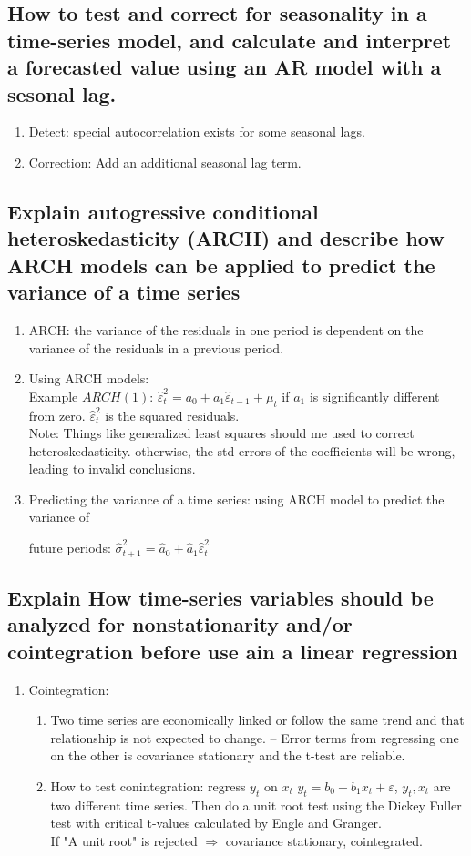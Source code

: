 \documentclass{article}
\newcommand{\be}{\begin{enumerate}}
\newcommand{\ee}{\end{enumerate}}
\begin{document}
\subsection{How to test and correct for seasonality in a time-series model, and 
calculate and interpret a forecasted value using an AR model with a sesonal lag.}
\be
    \item Detect: special autocorrelation exists for some seasonal lags.
    \item Correction: Add an additional seasonal lag term.
\ee
\subsection{Explain autogressive conditional heteroskedasticity (ARCH) and describe
how ARCH models can be applied to predict the variance of a time series}
\be
    \item ARCH: the variance of the residuals in one period is dependent on the variance of
        the residuals in a previous period.
    \item Using ARCH models:
        \\Example $ARCH(1)$: $\hat{\varepsilon}_t^2=a_0+a_1\hat{\varepsilon}_{t-1}+\mu_t$
        if $a_1$ is significantly different from zero. $\hat{\varepsilon}_t^2$ is the squared residuals.
        \\Note: Things like generalized least squares should me used to 
                correct heteroskedasticity. otherwise, the std errors of the 
                coefficients will be wrong, leading to invalid conclusions.
    \item Predicting the variance of a time series: using ARCH model to predict the variance of 

        future periods: $\hat{\sigma}^2_{t+1}=\hat{a}_0+\hat{a}_1\hat{\varepsilon}_t^2$
\ee
\subsection{Explain How time-series variables should be analyzed for nonstationarity and/or cointegration before
use ain a linear regression}
\be
    \item Cointegration: 
        \be
            \item Two time series are economically linked or follow the 
        same trend and that relationship is not expected to change. -- Error terms 
        from regressing one on the other is covariance stationary and the t-test are reliable.
            \item How to test conintegration: regress $y_t$ on $x_t$ 
                 $y_t=b_0+b_1x_t+\varepsilon$, $y_t, x_t$ are two different time series.
                 Then do a unit root test using the Dickey Fuller test with critical t-values
                 calculated by Engle and Granger. 
                 \\If "A unit root" is rejected $\Rightarrow$ covariance stationary, cointegrated.
        \ee
\ee
\end{document}
